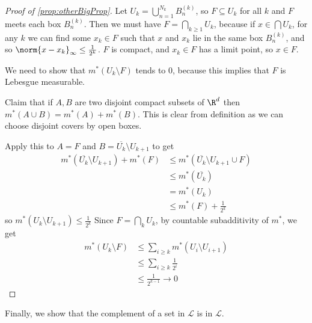\documentclass{article}
\newcommand{\1}[1]{\mathbbm{1}_{#1}}
\begin{document}
\begin{proof}[Proof of \cref{prop:otherBigProp}]
    Let $U_k = \bigcup_{n=1}^{N_k} B_n^{(k)}$, so $F \subseteq U_k$ for all $k$ and $F$ meets each box $B_n^{(k)}$.
    Then we must have $F = \bigcap_{k \geq 1} U_k$, because if $x \in \bigcap U_k$, for any $k$ we can find some $x_k \in F$ such that $x$ and $x_k$ lie in the same box $B_n^{(k)}$, and so $\norm{x - x_k}_\infty \leq \frac1{2^k}$.
    $F$ is compact, and $x_k \in F$ has a limit point, so $x \in F$.

    We need to show that $m^*(U_k \setminus F)$ tends to $0$, because this implies that $F$ is Lebesgue measurable.

    Claim that if $A, B$ are two disjoint compact subsets of $\R^d$ then $m^*(A \cup B) = m^*(A) + m^*(B)$. This is clear from definition as we can choose disjoint covers by open boxes.

    Apply this to $A = F$ and $B = \overline{U_k} \setminus U_{k+1}$ to get
    \begin{align*}
        m^*(\overline{U_k} \setminus U_{k+1}) + m^*(F) &\leq m^*(\overline{U_k} \setminus U_{k+1} \cup F) \\
                                                       &\leq m^*(\overline{U_k}) \\
                                                       &= m^*(U_k) \\
                                                       &\leq m^*(F) + \frac1{2^k}
    \end{align*}
    so $m^*(U_k \setminus U_{k+1}) \leq \frac1{2^k}$
    Since $F = \bigcap_k U_k$, by countable subadditivity of $m^*$, we get
    \begin{align*}
        m^*(U_k \setminus F) &\leq \sum_{i \geq k} m^* (U_i \setminus U_{i+1}) \\
                             &\leq \sum_{i \geq k} \frac{1}{2^i} \\
                             &\leq \frac{1}{2^{k-1}} \to 0
    \end{align*}
\end{proof}

Finally, we show that the complement of a set in $\mathcal{L}$ is in $\mathcal{L}$.
\end{document}
